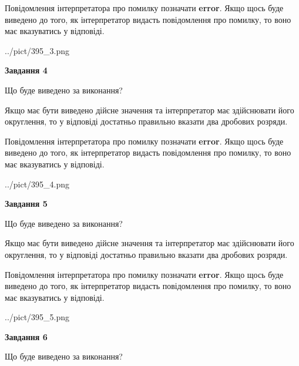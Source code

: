 \documentclass[12pt, ukrainian]{article}
\begin{document}
{\begin {Large}
Повідомлення інтерпретатора про помилку позначати \textbf{error}.
Якщо щось буде виведено до того, як інтерпретатор видасть повідомлення про помилку, 
то воно має вказуватись у відповіді. \par

\begin{center}
	{../pict/395_3.png}
\end{center}
\newpage

{\begin {center}\textbf{Завдання 4}\end {center}}\par
Що буде виведено за виконання? \par

Якщо має бути виведено дійсне значення та інтерпретатор має здійснювати його округлення, 
то у відповіді достатньо правильно вказати два дробових розряди.

Повідомлення інтерпретатора про помилку позначати \textbf{error}.
Якщо щось буде виведено до того, як інтерпретатор видасть повідомлення про помилку, 
то воно має вказуватись у відповіді. \par

\begin{center}
	{../pict/395_4.png}
\end{center}
\newpage

{\begin {center}\textbf{Завдання 5}\end {center}}\par
Що буде виведено за виконання? \par

Якщо має бути виведено дійсне значення та інтерпретатор має здійснювати його округлення, 
то у відповіді достатньо правильно вказати два дробових розряди.

Повідомлення інтерпретатора про помилку позначати \textbf{error}.
Якщо щось буде виведено до того, як інтерпретатор видасть повідомлення про помилку, 
то воно має вказуватись у відповіді. \par

\begin{center}
	{../pict/395_5.png}
\end{center}
\newpage

{\begin {center}\textbf{Завдання 6}\end {center}}\par
Що буде виведено за виконання? \par


\end{Large}}
\end{document}
